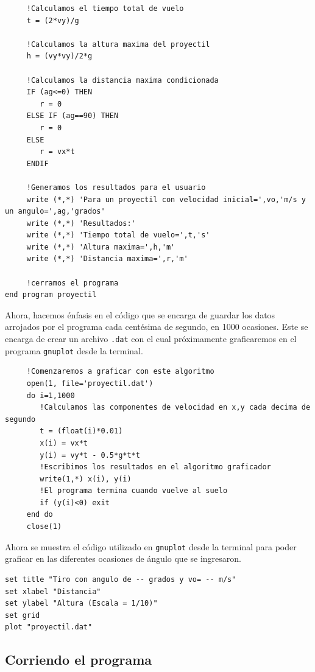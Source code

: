 \documentclass[a4paper]{article}
\begin{document}
\begin{verbatim}
     !Calculamos el tiempo total de vuelo
     t = (2*vy)/g

     !Calculamos la altura maxima del proyectil
     h = (vy*vy)/2*g 

     !Calculamos la distancia maxima condicionada
     IF (ag<=0) THEN
        r = 0
     ELSE IF (ag==90) THEN
        r = 0
     ELSE
        r = vx*t
     ENDIF

     !Generamos los resultados para el usuario
     write (*,*) 'Para un proyectil con velocidad inicial=',vo,'m/s y un angulo=',ag,'grados'
     write (*,*) 'Resultados:'
     write (*,*) 'Tiempo total de vuelo=',t,'s'
     write (*,*) 'Altura maxima=',h,'m'
     write (*,*) 'Distancia maxima=',r,'m'

     !cerramos el programa   
end program proyectil 
\end{verbatim}

Ahora, hacemos énfasis en el código que se encarga de guardar los datos arrojados por el programa cada centésima de segundo, en 1000 ocasiones. Este se encarga de crear un archivo \texttt{.dat} con el cual próximamente graficaremos en el programa \texttt{gnuplot} desde la terminal.

\begin{verbatim}
     !Comenzaremos a graficar con este algoritmo   
     open(1, file='proyectil.dat')   
     do i=1,1000
        !Calculamos las componentes de velocidad en x,y cada decima de segundo  
        t = (float(i)*0.01)   
        x(i) = vx*t   
        y(i) = vy*t - 0.5*g*t*t   
        !Escribimos los resultados en el algoritmo graficador   
        write(1,*) x(i), y(i)  
        !El programa termina cuando vuelve al suelo   
        if (y(i)<0) exit   
     end do
     close(1)
\end{verbatim}  

Ahora se muestra el código utilizado en \texttt{gnuplot} desde la terminal para poder graficar en las diferentes ocasiones de ángulo que se ingresaron. \\
\begin{verbatim}set title "Tiro con angulo de -- grados y vo= -- m/s" 
set xlabel "Distancia"
set ylabel "Altura (Escala = 1/10)"
set grid
plot "proyectil.dat"
\end{verbatim}

\subsection{Corriendo el programa}
\label{dos}
\end{document}
